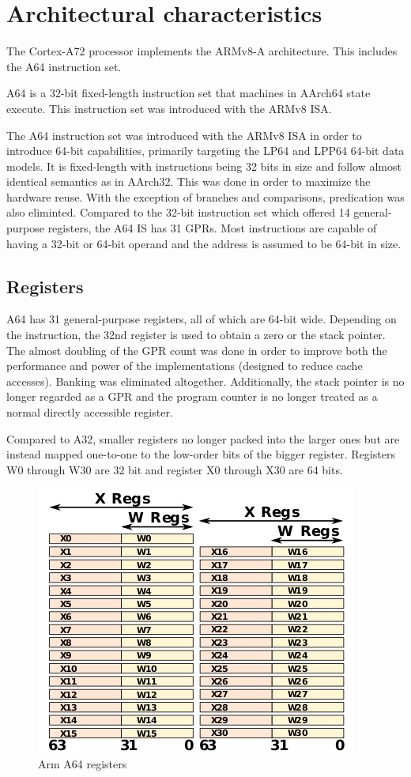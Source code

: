 \documentclass[12pt]{article}
\begin{document}
\section{Architectural characteristics}
\hspace{\parindent}The Cortex-A72 processor implements the ARMv8-A architecture. This includes the A64 instruction set.\par
A64 is a 32-bit fixed-length instruction set that machines in AArch64 state execute. This instruction set was introduced with the ARMv8 ISA.\par
The A64 instruction set was introduced with the ARMv8 ISA in order to introduce 64-bit capabilities, primarily targeting the LP64 and LPP64 64-bit data models. It is fixed-length with instructions being 32 bits in size and follow almost identical semantics as in AArch32. This was done in order to maximize the hardware reuse. With the exception of branches and comparisons, predication was also eliminted. Compared to the 32-bit instruction set which offered 14 general-purpose registers, the A64 IS has 31 GPRs. Most instructions are capable of having a 32-bit or 64-bit operand and the address is assumed to be 64-bit in size.\cite{a64instr2}

\subsection{Registers}
\hspace{\parindent}A64 has 31 general-purpose registers, all of which are 64-bit wide. Depending on the instruction, the 32nd register is used to obtain a zero or the stack pointer. The almost doubling of the GPR count was done in order to improve both the performance and power of the implementations (designed to reduce cache accesses). Banking was eliminated altogether. Additionally, the stack pointer is no longer regarded as a GPR and the program counter is no longer treated as a normal directly accessible register.\par
Compared to A32, smaller registers no longer packed into the larger ones but are instead mapped one-to-one to the low-order bits of the bigger register. Registers W0 through W30 are 32 bit and register X0 through X30 are 64 bits.\cite{a64instr2}

\begin{figure}[H]
\begin{center}
\includegraphics[width=0.6\linewidth]{imgs/arm-a64-registers.png}
\caption{Arm A64 registers}
\label{arma64registers}
\end{center}
\end{figure}
\end{document}
